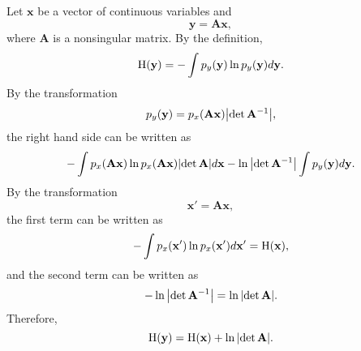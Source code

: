 \subsection{}
\label{1.32}
Let $\mathbf{x}$ be a vector of continuous variables and 
%
\begin{equation}
\mathbf{y} = \mathbf{A} \mathbf{x},
\end{equation}
%
where $\mathbf{A}$ is a nonsingular matrix.
By the definition, 
%
\begin{equation}
{\rm H}(\mathbf{y}) = - \int p_y(\mathbf{y}) \ln p_y(\mathbf{y}) d\mathbf{y}.
\end{equation}
%
By the transformation
%
\begin{equation}
p_y(\mathbf{y}) = p_x(\mathbf{A} \mathbf{x}) \abs{\det \mathbf{A} ^ {-1}},
\end{equation}
%
the right hand side can be written as
%
\begin{equation}
- \int p_x(\mathbf{A} \mathbf{x}) \ln p_x(\mathbf{A} \mathbf{x}) \abs{\det \mathbf{A}} d\mathbf{x} - \ln \abs{\det \mathbf{A} ^ {-1}} \int p_y(\mathbf{y}) d\mathbf{y}.
\end{equation}
%
By the transformation 
%
\begin{equation}
\mathbf{x}' = \mathbf{A} \mathbf{x},
\end{equation}
%
the first term can be written as
%
\begin{equation}
- \int p_x(\mathbf{x}') \ln p_x(\mathbf{x}') d\mathbf{x}' = {\rm H}(\mathbf{x}),
\end{equation}
%
and the second term can be written as
%
\begin{equation}
- \ln \abs{\det \mathbf{A} ^ {-1}} = \ln \abs{\det \mathbf{A}}.
\end{equation}
%
Therefore,
%
\begin{equation}
{\rm H}(\mathbf{y}) = {\rm H}(\mathbf{x}) + \ln \abs{\det \mathbf{A}}.
\end{equation}
%


